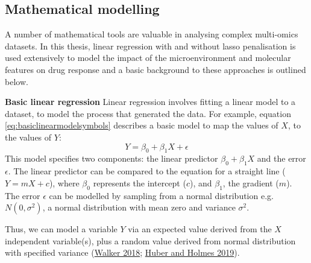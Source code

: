 \documentclass[11pt, a4paper, twosided]{book}
\begin{document}
\hypertarget{intro-multivariate-modelling}{%
\subsection{Mathematical modelling}\label{intro-multivariate-modelling}}

A number of mathematical tools are valuable in analysing complex multi-omics datasets. In this thesis, linear regression with and without lasso penalisation is used extensively to model the impact of the microenvironment and molecular features on drug response and a basic background to these approaches is outlined below.

\textbf{Basic linear regression}
Linear regression involves fitting a linear model to a dataset, to model the process that generated the data. For example, equation \eqref{eq:basiclinearmodelsymbols} describes a basic model to map the values of \(X\), to the values of \(Y\):
\begin{equation}
            Y = \beta_{0} + \beta_{1}X  + \epsilon
                                       \label{eq:basiclinearmodelsymbols}
    \end{equation}
This model specifies two components: the linear predictor \(\beta_{0} + \beta_{1}X\) and the error \(\epsilon\). The linear predictor can be compared to the equation for a straight line (\(Y = mX + c\)), where \(\beta_{0}\) represents the intercept (\(c\)), and \(\beta_{1}\), the gradient (\(m\)). The error \(\epsilon\) can be modelled by sampling from a normal distribution e.g.~\(N(0,\sigma^2)\), a normal distribution with mean zero and variance \(\sigma^2\).

Thus, we can model a variable \(Y\) via an expected value derived from the \(X\) independent variable(s), plus a random value derived from normal distribution with specified variance (\protect\hyperlink{ref-Walker2018}{Walker 2018}; \protect\hyperlink{ref-Huber2019}{Huber and Holmes 2019}).
\end{document}
